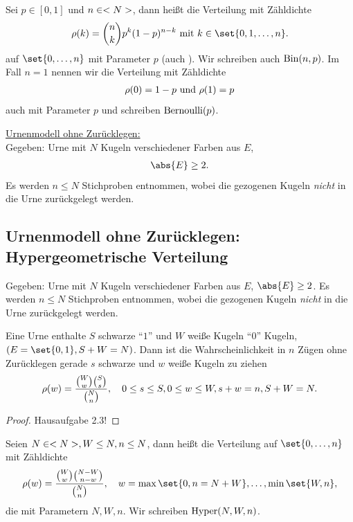 \begin{definition} 
	Sei $p \in [0,1]$ und $n \in <N>$, dann heißt die Verteilung mit Zähldichte
	\begin{align}
		\rho(k) = \binom{n}{k}p^k (1-p)^{n-k} \mit k \in \set{0,1,\dots,n}.\notag
	\end{align}
	 auf $\set{0, \dots,n}$ mit Parameter $p$ (auch ). Wir schreiben auch $\operatorname{Bin}(n,p)$. Im Fall $n = 1$ nennen wir die Verteilung mit Zähldichte
	\begin{align}
		\rho(0) = 1-p \text{ und } \rho(1) = p\notag
	\end{align}
	auch  mit Parameter $p$ und schreiben $\operatorname{Bernoulli}(p)$.
\end{definition}
\underline{Urnenmodell ohne Zurücklegen:} \\
Gegeben: Urne mit $N$ Kugeln verschiedener Farben aus $E$,
\begin{align}
	\abs{E} \ge 2.\notag
\end{align}
Es werden $n \le N$ Stichproben entnommen, wobei die gezogenen Kugeln \emph{nicht} in die Urne zurückgelegt werden.
\subsection{Urnenmodell ohne Zurücklegen: Hypergeometrische Verteilung}
Gegeben: Urne mit $N$ Kugeln verschiedener Farben aus $E$, $\abs{E} \ge 2$. Es werden $n \le N$ Stichproben entnommen, wobei die gezogenen Kugeln \emph{nicht} in die Urne zurückgelegt werden.
\begin{example}
	Eine Urne enthalte $S$ schwarze ``$1$'' und $W$ weiße Kugeln ``$0$'' Kugeln, $(E = \set{0,1}, S + W =N)$. Dann ist die Wahrscheinlichkeit in $n$ Zügen ohne Zurücklegen gerade $s$ schwarze und $w$ weiße Kugeln zu ziehen
	\begin{align}
		\rho(w) = \frac{\binom{W}{w}\binom{S}{s}}{\binom{N}{n}}, \quad 0 \le s \le S, 0 \le w \le W, s+w = n, S+W = N.\notag
	\end{align}
\end{example}
\begin{proof}
	Hausaufgabe 2.3!
\end{proof}
\begin{definition}
	Seien $N \in <N>, W \le N, n \le N$, dann heißt die Verteilung auf $\set{0,\dots,n}$ mit Zähldichte
	\begin{align}
		\rho(w) = \frac{\binom{W}{w}\binom{N-W}{n-w}}{\binom{N}{n}}, \quad w = \max\set{0,n=N+W}, \dots, \min\set{W,n},\notag
	\end{align}
	die  mit Parametern $N,W,n$. Wir schreiben $\operatorname{Hyper}(N,W,n)$.
\end{definition}
